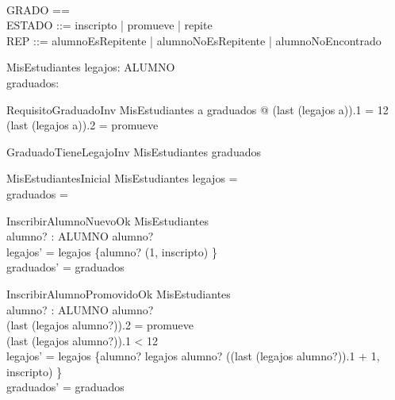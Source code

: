 \begin{zed}
    [ALUMNO] \\
    GRADO == \nat \\
    ESTADO ::= inscripto | promueve | repite \\
    REP ::= alumnoEsRepitente | alumnoNoEsRepitente | alumnoNoEncontrado
\end{zed}

\begin{schema}{MisEstudiantes}
    legajos: ALUMNO \pfun {} \\
    graduados: 
\end{schema}

\begin{schema}{RequisitoGraduadoInv}
    MisEstudiantes
    \where
    \forall a \in graduados @ (last \; (legajos \; a)).1 = 12 \land (last \; (legajos \; a)).2 = promueve
\end{schema}

\begin{schema}{GraduadoTieneLegajoInv}
    MisEstudiantes
    \where
    graduados \subseteq {}
\end{schema}

\begin{schema}{MisEstudiantesInicial}
    MisEstudiantes
    \where
    legajos = \emptyset \\
    graduados = \emptyset
\end{schema}

\begin{schema}{InscribirAlumnoNuevoOk}
    \Delta MisEstudiantes \\
    alumno? : ALUMNO
    \where
    alumno? \notin {} \\
    legajos' = legajos \cup \{alumno? \mapsto \langle (1, inscripto) \rangle\} \\
    graduados' = graduados
\end{schema}

\begin{schema}{InscribirAlumnoPromovidoOk}
    \Delta MisEstudiantes \\
    alumno? : ALUMNO
    \where
    alumno? \in {} \\
    (last \; (legajos \; alumno?)).2 = promueve \\
    (last \; (legajos \; alumno?)).1 < 12 \\ 
    legajos' = legajos \oplus \{alumno? \mapsto legajos \; alumno? \cat \langle ((last \; (legajos \; alumno?)).1 + 1, inscripto) \rangle\} \\
    graduados' = graduados
\end{schema}

